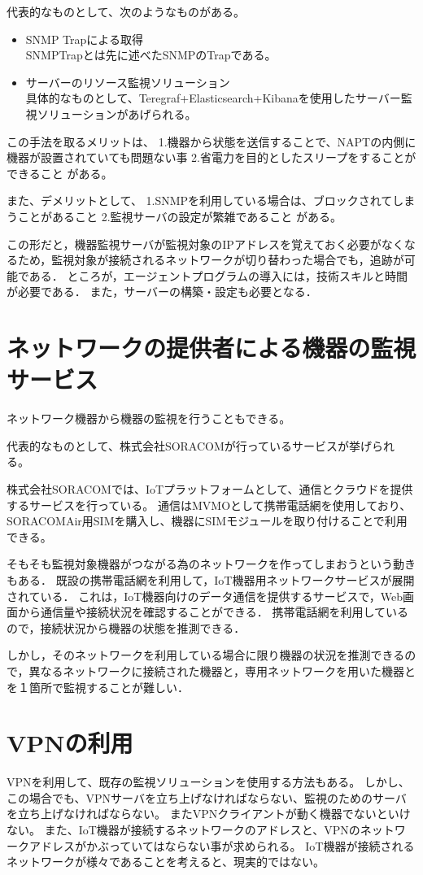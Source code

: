 	代表的なものとして、次のようなものがある。
	\begin{itemize}
		\item SNMP Trapによる取得\\
			SNMPTrapとは先に述べたSNMPのTrapである。
		\item サーバーのリソース監視ソリューション\\
			具体的なものとして、Teregraf+Elasticsearch+Kibanaを使用したサーバー監視ソリューションがあげられる。
	\end{itemize}
	
	この手法を取るメリットは、
	1.機器から状態を送信することで、NAPTの内側に機器が設置されていても問題ない事
	2.省電力を目的としたスリープをすることができること
	がある。

	また、デメリットとして、
	1.SNMPを利用している場合は、ブロックされてしまうことがあること
	2.監視サーバの設定が繁雑であること
	がある。

	この形だと，機器監視サーバが監視対象のIPアドレスを覚えておく必要がなくなるため，監視対象が接続されるネットワークが切り替わった場合でも，追跡が可能である．
	ところが，エージェントプログラムの導入には，技術スキルと時間が必要である．
	また，サーバーの構築・設定も必要となる．

\section{ネットワークの提供者による機器の監視サービス} %
	ネットワーク機器から機器の監視を行うこともできる。

	代表的なものとして、株式会社SORACOMが行っているサービスが挙げられる。

	株式会社SORACOMでは、IoTプラットフォームとして、通信とクラウドを提供するサービスを行っている。
	通信はMVMOとして携帯電話網を使用しており、SORACOMAir用SIMを購入し、機器にSIMモジュールを取り付けることで利用できる。

	そもそも監視対象機器がつながる為のネットワークを作ってしまおうという動きもある．
	既設の携帯電話網を利用して，IoT機器用ネットワークサービスが展開されている．
	これは，IoT機器向けのデータ通信を提供するサービスで，Web画面から通信量や接続状況を確認することができる．
	携帯電話網を利用しているので，接続状況から機器の状態を推測できる．

	しかし，そのネットワークを利用している場合に限り機器の状況を推測できるので，異なるネットワークに接続された機器と，専用ネットワークを用いた機器とを１箇所で監視することが難しい．

\section{VPNの利用}
	VPNを利用して、既存の監視ソリューションを使用する方法もある。
	しかし、この場合でも、VPNサーバを立ち上げなければならない、監視のためのサーバを立ち上げなければならない。
	またVPNクライアントが動く機器でないといけない。
	また、IoT機器が接続するネットワークのアドレスと、VPNのネットワークアドレスがかぶっていてはならない事が求められる。
	IoT機器が接続されるネットワークが様々であることを考えると、現実的ではない。

